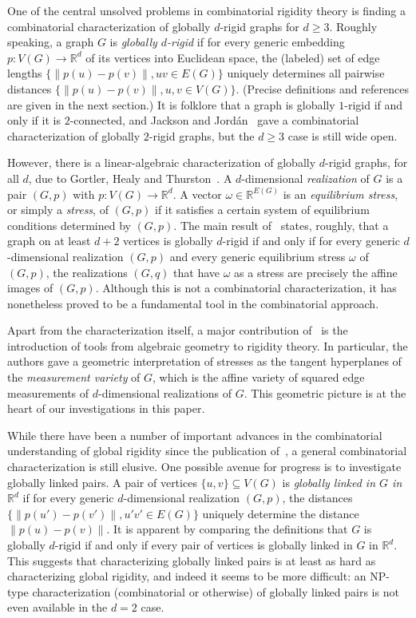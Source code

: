 \documentclass[11pt,a4paper,dvipsnames]{scrartcl}
\theoremstyle{definition}
\newcommand{\RR}{\mathbb{R}}
\newcommand{\globrig}[1]{globally $#1$-rigid}
\begin{document}
One of the central unsolved problems in combinatorial rigidity theory is finding a combinatorial characterization of \globrig{d} graphs for $d \geq 3$. Roughly speaking, a graph $G$ is \emph{\globrig{d}} if for every generic embedding $p : V(G) \rightarrow \RR^d$ of its vertices into Euclidean space, the (labeled) set of edge lengths $\big\{\lVert p(u) - p(v) \rVert, uv \in E(G)\big\}$ uniquely determines all pairwise distances $\big\{\lVert p(u) - p(v)\rVert, u,v \in V(G)\big\}$. (Precise definitions and references are given in the next section.)
It is folklore that a graph is \globrig{1} if and only if it is $2$-connected, and Jackson and Jordán~\cite{jackson.jordan_2005} gave a combinatorial characterization of \globrig{2} graphs, but the $d \geq 3$ case is still wide open.

However, there is a linear-algebraic characterization of globally $d$-rigid graphs, for all $d$, due to Gortler, Healy and Thurston~\cite{gortler.etal_2010}. 
A $d$-dimensional \emph{realization} of $G$ is a pair $(G,p)$ with $p: V(G) \rightarrow \RR^d$. A vector $\omega \in \RR^{E(G)}$ is an \emph{equilibrium stress}, or simply a \emph{stress}, of $(G,p)$ if it satisfies a certain system of equilibrium conditions determined by $(G,p)$. The main result of~\cite{gortler.etal_2010} states, roughly, that a graph on at least $d+2$ vertices is \globrig{d} if and only if for every generic $d$-dimensional realization $(G,p)$ and every generic equilibrium stress $\omega$ of $(G,p)$, the realizations $(G,q)$ that have $\omega$ as a stress are precisely the affine images of $(G,p)$. 
Although this is not a combinatorial characterization, it has nonetheless proved to be a fundamental tool in the combinatorial approach. 

Apart from the characterization itself, a major contribution of~\cite{gortler.etal_2010} is the introduction of tools from algebraic geometry to rigidity theory. In particular, the authors gave a geometric interpretation of stresses as the tangent hyperplanes of the \emph{measurement variety} of $G$, which is the affine variety of squared edge measurements of $d$-dimensional realizations of $G$. This geometric picture is at the heart of our investigations in this paper.

While there have been a number of important advances in the combinatorial understanding of global rigidity %
since the publication of~\cite{gortler.etal_2010},
a general combinatorial characterization is still elusive. 
One possible avenue for progress 
is to investigate globally linked pairs. A pair of vertices $\{u,v\} \subseteq V(G)$ is \emph{globally linked in $G$ in $\RR^d$} if for every generic $d$-dimensional realization $(G,p)$, the distances $\big\{\lVert p(u') - p(v')\rVert, u'v' \in E(G)\big\}$ uniquely determine the distance $\lVert p(u) - p(v) \rVert$. It is apparent by comparing the definitions that $G$ is \globrig{d} if and only if every pair of vertices is globally linked in $G$ in $\RR^d$. This suggests that characterizing globally linked pairs is at least as hard as characterizing global rigidity, and indeed it seems to be more difficult: an NP-type characterization (combinatorial or otherwise) of globally linked pairs is not even available in the $d=2$ case. %
\end{document}
